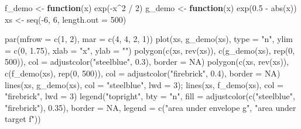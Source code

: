 \documentclass[
  letterpaper,
  DIV=11,
  numbers=noendperiod]{scrreprt}
\newenvironment{Shaded}{\begin{snugshade}}{\end{snugshade}}
\newcommand{\AttributeTok}[1]{\textcolor[rgb]{0.40,0.45,0.13}{#1}}
\newcommand{\ConstantTok}[1]{\textcolor[rgb]{0.56,0.35,0.01}{#1}}
\newcommand{\ControlFlowTok}[1]{\textcolor[rgb]{0.00,0.23,0.31}{\textbf{#1}}}
\newcommand{\DecValTok}[1]{\textcolor[rgb]{0.68,0.00,0.00}{#1}}
\newcommand{\FloatTok}[1]{\textcolor[rgb]{0.68,0.00,0.00}{#1}}
\newcommand{\FunctionTok}[1]{\textcolor[rgb]{0.28,0.35,0.67}{#1}}
\newcommand{\NormalTok}[1]{\textcolor[rgb]{0.00,0.23,0.31}{#1}}
\newcommand{\OtherTok}[1]{\textcolor[rgb]{0.00,0.23,0.31}{#1}}
\newcommand{\SpecialCharTok}[1]{\textcolor[rgb]{0.37,0.37,0.37}{#1}}
\newcommand{\StringTok}[1]{\textcolor[rgb]{0.13,0.47,0.30}{#1}}
\begin{document}
\begin{Shaded}
\begin{Highlighting}[]
\NormalTok{f\_demo }\OtherTok{\textless{}{-}} \ControlFlowTok{function}\NormalTok{(x) }\FunctionTok{exp}\NormalTok{(}\SpecialCharTok{{-}}\NormalTok{x}\SpecialCharTok{\^{}}\DecValTok{2} \SpecialCharTok{/} \DecValTok{2}\NormalTok{)}
\NormalTok{g\_demo }\OtherTok{\textless{}{-}} \ControlFlowTok{function}\NormalTok{(x) }\FunctionTok{exp}\NormalTok{(}\FloatTok{0.5} \SpecialCharTok{{-}} \FunctionTok{abs}\NormalTok{(x))}
\NormalTok{xs }\OtherTok{\textless{}{-}} \FunctionTok{seq}\NormalTok{(}\SpecialCharTok{{-}}\DecValTok{6}\NormalTok{, }\DecValTok{6}\NormalTok{, }\AttributeTok{length.out =} \DecValTok{500}\NormalTok{)}

\FunctionTok{par}\NormalTok{(}\AttributeTok{mfrow =} \FunctionTok{c}\NormalTok{(}\DecValTok{1}\NormalTok{, }\DecValTok{2}\NormalTok{), }\AttributeTok{mar =} \FunctionTok{c}\NormalTok{(}\DecValTok{4}\NormalTok{, }\DecValTok{4}\NormalTok{, }\DecValTok{2}\NormalTok{, }\DecValTok{1}\NormalTok{))}
\FunctionTok{plot}\NormalTok{(xs, }\FunctionTok{g\_demo}\NormalTok{(xs), }\AttributeTok{type =} \StringTok{"n"}\NormalTok{, }\AttributeTok{ylim =} \FunctionTok{c}\NormalTok{(}\DecValTok{0}\NormalTok{, }\FloatTok{1.75}\NormalTok{), }\AttributeTok{xlab =} \StringTok{"x"}\NormalTok{, }\AttributeTok{ylab =} \StringTok{""}\NormalTok{)}
\FunctionTok{polygon}\NormalTok{(}\FunctionTok{c}\NormalTok{(xs, }\FunctionTok{rev}\NormalTok{(xs)), }\FunctionTok{c}\NormalTok{(}\FunctionTok{g\_demo}\NormalTok{(xs), }\FunctionTok{rep}\NormalTok{(}\DecValTok{0}\NormalTok{, }\DecValTok{500}\NormalTok{)), }\AttributeTok{col =} \FunctionTok{adjustcolor}\NormalTok{(}\StringTok{"steelblue"}\NormalTok{, }\FloatTok{0.3}\NormalTok{), }\AttributeTok{border =} \ConstantTok{NA}\NormalTok{)}
\FunctionTok{polygon}\NormalTok{(}\FunctionTok{c}\NormalTok{(xs, }\FunctionTok{rev}\NormalTok{(xs)), }\FunctionTok{c}\NormalTok{(}\FunctionTok{f\_demo}\NormalTok{(xs), }\FunctionTok{rep}\NormalTok{(}\DecValTok{0}\NormalTok{, }\DecValTok{500}\NormalTok{)), }\AttributeTok{col =} \FunctionTok{adjustcolor}\NormalTok{(}\StringTok{"firebrick"}\NormalTok{, }\FloatTok{0.4}\NormalTok{), }\AttributeTok{border =} \ConstantTok{NA}\NormalTok{)}
\FunctionTok{lines}\NormalTok{(xs, }\FunctionTok{g\_demo}\NormalTok{(xs), }\AttributeTok{col =} \StringTok{"steelblue"}\NormalTok{, }\AttributeTok{lwd =} \DecValTok{3}\NormalTok{); }\FunctionTok{lines}\NormalTok{(xs, }\FunctionTok{f\_demo}\NormalTok{(xs), }\AttributeTok{col =} \StringTok{"firebrick"}\NormalTok{, }\AttributeTok{lwd =} \DecValTok{3}\NormalTok{)}
\FunctionTok{legend}\NormalTok{(}\StringTok{"topright"}\NormalTok{, }\AttributeTok{bty =} \StringTok{"n"}\NormalTok{, }\AttributeTok{fill =} \FunctionTok{adjustcolor}\NormalTok{(}\FunctionTok{c}\NormalTok{(}\StringTok{"steelblue"}\NormalTok{, }\StringTok{"firebrick"}\NormalTok{), }\FloatTok{0.35}\NormalTok{), }\AttributeTok{border =} \ConstantTok{NA}\NormalTok{,}
       \AttributeTok{legend =} \FunctionTok{c}\NormalTok{(}\StringTok{"area under envelope g"}\NormalTok{, }\StringTok{"area under target f"}\NormalTok{))}


\end{Highlighting}
\end{Shaded}
\end{document}
